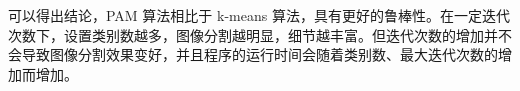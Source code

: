\documentclass[12pt,AutoFakeBold]{article}
\begin{document}
可以得出结论，PAM 算法相比于 k-means 算法，具有更好的鲁棒性。在一定迭代次数下，设置类别数越多，图像分割越明显，细节越丰富。但迭代次数的增加并不会导致图像分割效果变好，并且程序的运行时间会随着类别数、最大迭代次数的增加而增加。

\newpage






%  
\end{document}

